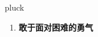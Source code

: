 
\begin{frame}
{\huge pluck}
\begin{center}
\begin{enumerate}\Large
  \item \textbf{敢于面对困难的勇气}
\end{enumerate}
\end{center}
\end{frame}
